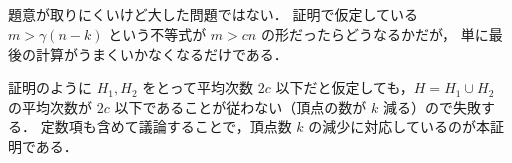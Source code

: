 \subsection{}
題意が取りにくいけど大した問題ではない．
証明で仮定している $m > \gamma(n-k)$ という不等式が $m > cn$ の形だったらどうなるかだが，
単に最後の計算がうまくいかなくなるだけである．

証明のように $H_1, H_2$ をとって平均次数 $2c$ 以下だと仮定しても，$H=H_1\cup H_2$ の平均次数が $2c$ 以下であることが従わない（頂点の数が $k$ 減る）ので失敗する．
定数項も含めて議論することで，頂点数 $k$ の減少に対応しているのが本証明である．

